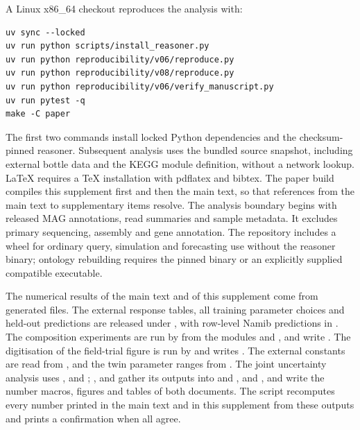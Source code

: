 \documentclass[11pt,a4paper]{article}
\begin{document}
A Linux x86\_64 checkout reproduces the analysis with:
\begin{verbatim}
uv sync --locked
uv run python scripts/install_reasoner.py
uv run python reproducibility/v06/reproduce.py
uv run python reproducibility/v08/reproduce.py
uv run python reproducibility/v06/verify_manuscript.py
uv run pytest -q
make -C paper
\end{verbatim}
The first two commands install locked Python dependencies and the checksum-pinned reasoner. Subsequent analysis uses the bundled source snapshot, including external bottle data and the KEGG module definition, without a network lookup. LaTeX requires a TeX installation with pdflatex and bibtex. The paper build compiles this supplement first and then the main text, so that references from the main text to supplementary items resolve. The analysis boundary begins with released MAG annotations, read summaries and sample metadata. It excludes primary sequencing, assembly and gene annotation. The repository includes a wheel for ordinary query, simulation and forecasting use without the reasoner binary; ontology rebuilding requires the pinned binary or an explicitly supplied compatible executable.

The numerical results of the main text and of this supplement come from generated files. The external response tables, all training parameter choices and held-out predictions are released under , with row-level Namib predictions in . The composition experiments are run by  from the modules  and , and write . The digitisation of the field-trial figure is run by  and writes . The external constants are read from , and the twin parameter ranges from . The joint uncertainty analysis uses ,  and ; ,  and  gather its outputs into  and , and ,  and  write the number macros, figures and tables of both documents. The script  recomputes every number printed in the main text and in this supplement from these outputs and prints a confirmation when all agree.
\end{document}
